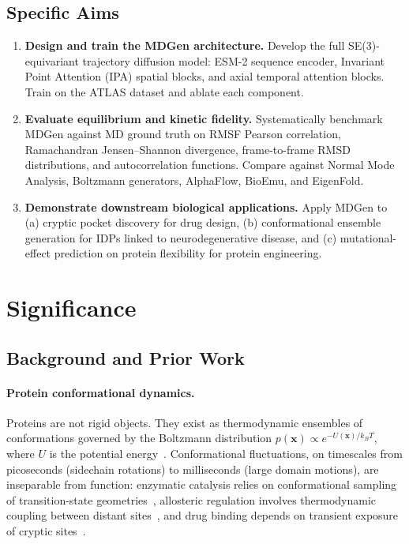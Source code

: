 \documentclass[12pt,letterpaper]{article}
\begin{document}
\subsection*{Specific Aims}
\begin{enumerate}[label=\textbf{Aim \arabic*.},leftmargin=*]
\item \textbf{Design and train the MDGen architecture.} Develop the full SE(3)-equivariant trajectory diffusion model: ESM-2 sequence encoder, Invariant Point Attention (IPA) spatial blocks, and axial temporal attention blocks. Train on the ATLAS dataset and ablate each component.
\item \textbf{Evaluate equilibrium and kinetic fidelity.} Systematically benchmark MDGen against MD ground truth on RMSF Pearson correlation, Ramachandran Jensen--Shannon divergence, frame-to-frame RMSD distributions, and autocorrelation functions. Compare against Normal Mode Analysis, Boltzmann generators, AlphaFlow, BioEmu, and EigenFold.
\item \textbf{Demonstrate downstream biological applications.} Apply MDGen to (a) cryptic pocket discovery for drug design, (b) conformational ensemble generation for IDPs linked to neurodegenerative disease, and (c) mutational-effect prediction on protein flexibility for protein engineering.
\end{enumerate}

\section{Significance}

\subsection*{Background and Prior Work}

\paragraph{Protein conformational dynamics.}
Proteins are not rigid objects. They exist as thermodynamic ensembles of conformations governed by the Boltzmann distribution $p(\mathbf{x}) \propto e^{-U(\mathbf{x})/k_BT}$, where $U$ is the potential energy~\cite{frauenfelder1991energy,henzler2007dynamic}. Conformational fluctuations, on timescales from picoseconds (sidechain rotations) to milliseconds (large domain motions), are inseparable from function: enzymatic catalysis relies on conformational sampling of transition-state geometries~\cite{hammes2009multiple}, allosteric regulation involves thermodynamic coupling between distant sites~\cite{nussinov2013allostery}, and drug binding depends on transient exposure of cryptic sites~\cite{bowman2012discovery}.
\end{document}
